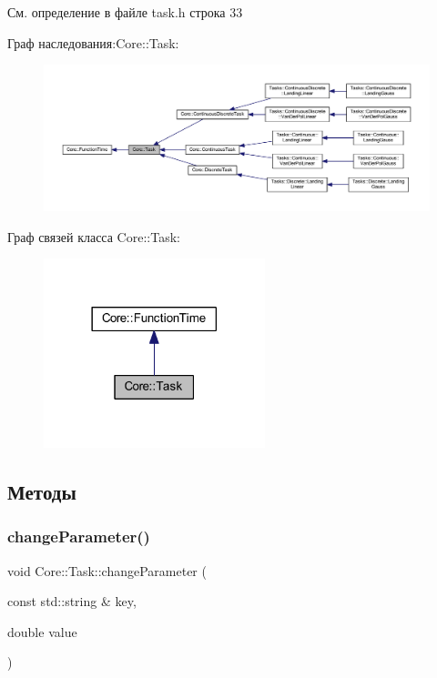 См. определение в файле task.\+h строка 33



Граф наследования\+:Core\+:\+:Task\+:
\nopagebreak
\begin{figure}[H]
\begin{center}
\leavevmode
\includegraphics[width=350pt]{class_core_1_1_task__inherit__graph}
\end{center}
\end{figure}


Граф связей класса Core\+:\+:Task\+:
\nopagebreak
\begin{figure}[H]
\begin{center}
\leavevmode
\includegraphics[width=182pt]{class_core_1_1_task__coll__graph}
\end{center}
\end{figure}


\subsection{Методы}
\hypertarget{class_core_1_1_task_ac8b451d78816e62347954452b7ace250}{}\label{class_core_1_1_task_ac8b451d78816e62347954452b7ace250} 
\subsubsection{\texorpdfstring{change\+Parameter()}{changeParameter()}}
{\footnotesize\ttfamily void Core\+::\+Task\+::change\+Parameter (\begin{DoxyParamCaption}\item[{const std\+::string \&}]{key,  }\item[{double}]{value }\end{DoxyParamCaption})}



